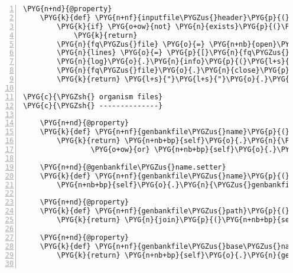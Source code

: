 \begin{Verbatim}[commandchars=\\\{\},numbers=left,firstnumber=1,stepnumber=5]
    \PYG{n+nd}{@property}
    \PYG{k}{def} \PYG{n+nf}{inputfile\PYGZus{}header}\PYG{p}{(}\PYG{n+nb+bp}{self}\PYG{p}{)}\PYG{p}{:}
        \PYG{k}{if} \PYG{o+ow}{not} \PYG{n}{exists}\PYG{p}{(}\PYG{n+nb+bp}{self}\PYG{o}{.}\PYG{n}{inputfile\PYGZus{}fq\PYGZus{}path}\PYG{p}{)}\PYG{p}{:}
            \PYG{k}{return}
        \PYG{n}{fq\PYGZus{}file} \PYG{o}{=} \PYG{n+nb}{open}\PYG{p}{(}\PYG{n+nb+bp}{self}\PYG{o}{.}\PYG{n}{inputfile\PYGZus{}fq\PYGZus{}path}\PYG{p}{)}
        \PYG{n}{lines} \PYG{o}{=} \PYG{p}{[}\PYG{n}{fq\PYGZus{}file}\PYG{o}{.}\PYG{n}{readline}\PYG{p}{(}\PYG{p}{)} \PYG{k}{for} \PYG{n}{i} \PYG{o+ow}{in} \PYG{n+nb}{range}\PYG{p}{(}\PYG{l+m+mi}{4}\PYG{p}{)}\PYG{p}{]}
        \PYG{n}{log}\PYG{o}{.}\PYG{n}{info}\PYG{p}{(}\PYG{l+s}{"}\PYG{l+s}{Header: }\PYG{l+s+si}{\PYGZpc{}s}\PYG{l+s}{"} \PYG{o}{\PYGZpc{}} \PYG{n}{lines}\PYG{p}{[}\PYG{l+m+mi}{0}\PYG{p}{]}\PYG{p}{)}
        \PYG{n}{fq\PYGZus{}file}\PYG{o}{.}\PYG{n}{close}\PYG{p}{(}\PYG{p}{)}
        \PYG{k}{return} \PYG{l+s}{"}\PYG{l+s}{"}\PYG{o}{.}\PYG{n}{join}\PYG{p}{(}\PYG{n}{lines}\PYG{p}{)}

\PYG{c}{\PYGZsh{} organism files}
\PYG{c}{\PYGZsh{} --------------}

    \PYG{n+nd}{@property}
    \PYG{k}{def} \PYG{n+nf}{genbankfile\PYGZus{}name}\PYG{p}{(}\PYG{n+nb+bp}{self}\PYG{p}{)}\PYG{p}{:}
        \PYG{k}{return} \PYG{n+nb+bp}{self}\PYG{o}{.}\PYG{n}{\PYGZus{}genbankfile\PYGZus{}name} \PYGZbs{}
                \PYG{o+ow}{or} \PYG{n+nb+bp}{self}\PYG{o}{.}\PYG{n}{org\PYGZus{}accession} \PYG{o+ow}{and} \PYG{n+nb+bp}{self}\PYG{o}{.}\PYG{n}{org\PYGZus{}accession} \PYG{o}{+} \PYG{l+s}{"}\PYG{l+s}{.gb}\PYG{l+s}{"}

    \PYG{n+nd}{@genbankfile\PYGZus{}name.setter}
    \PYG{k}{def} \PYG{n+nf}{genbankfile\PYGZus{}name}\PYG{p}{(}\PYG{n+nb+bp}{self}\PYG{p}{,} \PYG{n}{value}\PYG{p}{)}\PYG{p}{:}
        \PYG{n+nb+bp}{self}\PYG{o}{.}\PYG{n}{\PYGZus{}genbankfile\PYGZus{}name} \PYG{o}{=} \PYG{n}{value}

    \PYG{n+nd}{@property}
    \PYG{k}{def} \PYG{n+nf}{genbankfile\PYGZus{}path}\PYG{p}{(}\PYG{n+nb+bp}{self}\PYG{p}{)}\PYG{p}{:}
        \PYG{k}{return} \PYG{n}{join}\PYG{p}{(}\PYG{n+nb+bp}{self}\PYG{o}{.}\PYG{n}{genbank\PYGZus{}data\PYGZus{}dir}\PYG{p}{,} \PYG{n+nb+bp}{self}\PYG{o}{.}\PYG{n}{genbankfile\PYGZus{}name}\PYG{p}{)}

    \PYG{n+nd}{@property}
    \PYG{k}{def} \PYG{n+nf}{genbankfile\PYGZus{}base\PYGZus{}name}\PYG{p}{(}\PYG{n+nb+bp}{self}\PYG{p}{)}\PYG{p}{:}
        \PYG{k}{return} \PYG{n+nb+bp}{self}\PYG{o}{.}\PYG{n}{genbankfile\PYGZus{}name}\PYG{o}{.}\PYG{n}{rsplit}\PYG{p}{(}\PYG{l+s}{"}\PYG{l+s}{.}\PYG{l+s}{"}\PYG{p}{,} \PYG{l+m+mi}{1}\PYG{p}{)}\PYG{p}{[}\PYG{l+m+mi}{0}\PYG{p}{]}


\end{Verbatim}
